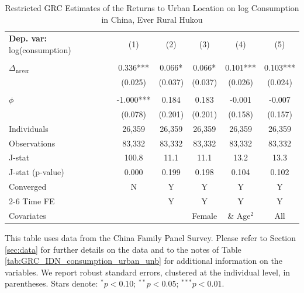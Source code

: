 \begin{table}[htbp] \centering \begin{threeparttable}
 \caption{Restricted GRC Estimates of the Returns to Urban Location on log Consumption in China, Ever Rural Hukou} 
 \label{tab:GRC_CHN_ever_rural_consumption_urban_unb} 
\begin{tabular}{l ccccc} \toprule  \textbf{Dep. var:}  log(consumption) 
                    &\multicolumn{1}{c}{(1)}   &\multicolumn{1}{c}{(2)}   &\multicolumn{1}{c}{(3)}   &\multicolumn{1}{c}{(4)}   &\multicolumn{1}{c}{(5)}   \\
                    &               &               &               &               &               \\
\addlinespace
$\Delta_{\text{never}}$&       0.336***&       0.066*  &       0.066*  &       0.101***&       0.103***\\
                    &     (0.025)   &     (0.037)   &     (0.037)   &     (0.026)   &     (0.024)   \\
                    &               &               &               &               &               \\
\addlinespace
$\phi$              &      -1.000***&       0.184   &       0.183   &      -0.001   &      -0.007   \\
                    &     (0.078)   &     (0.201)   &     (0.201)   &     (0.158)   &     (0.157)   \\
\addlinespace
Individuals         &      26,359   &      26,359   &      26,359   &      26,359   &      26,359   \\
Observations        &      83,332   &      83,332   &      83,332   &      83,332   &      83,332   \\
J-stat              &       100.8   &        11.1   &        11.1   &        13.2   &        13.3   \\
J-stat (p-value)    &       0.000   &       0.199   &       0.198   &       0.104   &       0.102   \\
Converged           &           N   &           Y   &           Y   &           Y   &           Y   \\
\cmidrule{2-6} Time FE & & Y & Y & Y & Y \\ Covariates & & & Female & \& Age$^2$ & All \\ \bottomrule \end{tabular} \begin{tablenotes}[flushleft] \footnotesize \item{This table uses data from the China Family Panel Survey. Please refer to Section \ref{sec:data} for further details on the data and to the notes of Table \ref{tab:GRC_IDN_consumption_urban_unb} for additional information on the variables. We report robust standard errors, clustered at the individual level, in parentheses. Stars denote: $^{*} p<0.10$; $^{**} p<0.05$; $^{***} p<0.01$.} \end{tablenotes} \end{threeparttable} \end{table}
